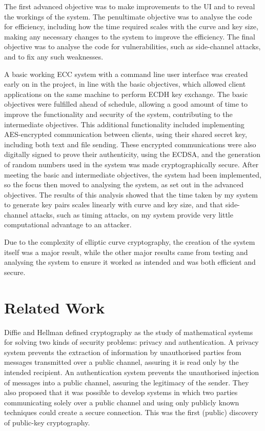 \documentclass[12pt,a4paper]{article}
\begin{document}
The first advanced objective was to make improvements to the UI and to reveal the workings of the system. 
The penultimate objective was to analyse the code for efficiency, 
including how the time required scales with the curve and key size, 
making any necessary changes to the system to improve the efficiency. 
The final objective was to analyse the code for vulnerabilities, such as side-channel attacks, 
and to fix any such weaknesses. 

A basic working ECC system with a command line user interface was created early on in the project, 
in line with the basic objectives, 
which allowed client applications on the same machine to perform ECDH key exchange. 
The basic objectives were fulfilled ahead of schedule, 
allowing a good amount of time to improve the functionality and security of the system, contributing to the intermediate objectives. 
This additional functionality included implementing AES-encrypted communication between clients, 
using their shared secret key, including both text and file sending. 
These encrypted communications were also digitally signed to prove their authenticity, using the ECDSA, 
and the generation of random numbers used in the system was made cryptographically secure. 
After meeting the basic and intermediate objectives, the system had been implemented, 
so the focus then moved to analysing the system, as set out in the advanced objectives. 
The results of this analysis showed that the time taken by my system to generate key pairs scales linearly with curve and key size, and that side-channel attacks, such as timing attacks, on my system provide very little computational advantage to an attacker. 

Due to the complexity of elliptic curve cryptography, the creation of the system itself was a major result, while the other major results came from testing and analysing the system to ensure it worked as intended and was both efficient and secure. 


\section{Related Work} \noindent
Diffie and Hellman \citeyear{1055638} defined cryptography as the study of 
mathematical systems for solving two kinds of security problems: privacy and authentication. 
A privacy system prevents the extraction of information by unauthorised parties from messages transmitted over a public channel, 
assuring it is read only by the intended recipient. 
An authentication system prevents the unauthorised injection of messages into a public channel, assuring the legitimacy of the sender. 
They also proposed that it was possible to develop systems in which two parties 
communicating solely over a public channel and using only publicly known techniques could create a secure connection. 
This was the first (public) discovery of public-key cryptography. 
\end{document}

